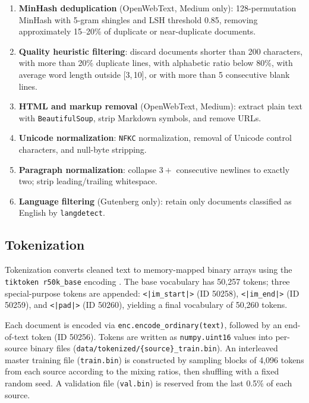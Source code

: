 \documentclass[12pt]{article}
\begin{document}
\begin{enumerate}[leftmargin=1.2cm]
  \item \textbf{MinHash deduplication} (OpenWebText, Medium only): 128-permutation MinHash with 5-gram shingles and LSH threshold 0.85, removing approximately 15--20\% of duplicate or near-duplicate documents.
  \item \textbf{Quality heuristic filtering}: discard documents shorter than 200 characters, with more than 20\% duplicate lines, with alphabetic ratio below 80\%, with average word length outside [3,\,10], or with more than 5 consecutive blank lines.
  \item \textbf{HTML and markup removal} (OpenWebText, Medium): extract plain text with \texttt{BeautifulSoup}, strip Markdown symbols, and remove URLs.
  \item \textbf{Unicode normalization}: \texttt{NFKC} normalization, removal of Unicode control characters, and null-byte stripping.
  \item \textbf{Paragraph normalization}: collapse $3+$ consecutive newlines to exactly two; strip leading/trailing whitespace.
  \item \textbf{Language filtering} (Gutenberg only): retain only documents classified as English by \texttt{langdetect}.
\end{enumerate}

\subsection{Tokenization}

Tokenization converts cleaned text to memory-mapped binary arrays using the \texttt{tiktoken r50k\_base} encoding \citep{radford2019language}. The base vocabulary has 50,257 tokens; three special-purpose tokens are appended: \texttt{<|im\_start|>} (ID 50258), \texttt{<|im\_end|>} (ID 50259), and \texttt{<|pad|>} (ID 50260), yielding a final vocabulary of 50,260 tokens.

Each document is encoded via \texttt{enc.encode\_ordinary(text)}, followed by an end-of-text token (ID 50256). Tokens are written as \texttt{numpy.uint16} values into per-source binary files \linebreak (\texttt{data/tokenized/\{source\}\_train.bin}). An interleaved master training file (\texttt{train.bin}) is constructed by sampling blocks of 4,096 tokens from each source according to the mixing ratios, then shuffling with a fixed random seed. A validation file (\texttt{val.bin}) is reserved from the last 0.5\% of each source.
\end{document}
